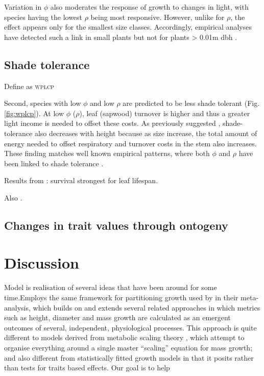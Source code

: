 \documentclass[a4paper,11pt]{article}
\begin{document}
Variation in $\phi$ also moderates the response of growth to changes in light, with species having the lowest $\rho$ being most responsive. However, unlike for $\rho$, the effect appears only for the smallest size classes. Accordingly, empirical analyses have detected such a link in small plants but not for plants \textgreater{} 0.01m dbh \citep{Ruger-2012}.


\subsection{Shade tolerance}

Define as \textsc{wplcp}

Second, species with low $\phi$ and low $\rho$ are predicted to be less shade tolerant (Fig. \ref{fig:wplcp}). At low $\phi$ ($\rho$), leaf (sapwood) turnover is higher and thus a greater light income is needed to offset these costs. As previously suggested \citep{Givnish-1988}, shade-tolerance also decreases with height because as size increase, the total amount of energy needed to offset respiratory and turnover costs in the stem also increases. These finding matches well known empirical patterns, where both $\phi$ and $\rho$ have been linked to shade tolerance \citep{Poorter-2006, Lusk-2008,Osunkoya-1996}.

Results from \citet{Poorter-2006}: survival strongest for leaf lifespan.

Also \citep{Baltzer-2007}.

\subsection{Changes in trait values through ontogeny}

\section{Discussion}


Model is realisation of several ideas that have been around for some
time.Employs the same framework for partitioning growth used by \citet{Gibert-2016} in their meta-analysis, which builds on and extends several related approaches \citep{Givnish-1988, Yokozawa-1995, Makela-1997, Moorcroft-2001, Falster-2011, King-2011} in which metrics such as height, diameter and mass growth are calculated as an emergent outcomes of several, independent, physiological processes. This approach is quite different to models derived from metabolic scaling theory \citep{Enquist-1999, Enquist-2007}, which attempt to organise everything around a single master ``scaling'' equation for mass growth; and also different from statistically fitted growth models \citep[e.g.][]{Herault-2011, Ruger-2012, Iida-2014} in that it posits rather than tests for traits based effects. Our goal is to help 
\end{document}
